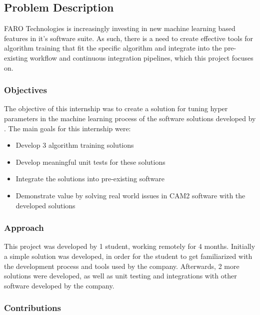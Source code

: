 
\subsection{Problem Description}

FARO Technologies\textsuperscript{\textregistered} is increasingly investing in new machine learning based features in it's software suite. As such, there is a need to create effective tools for algorithm training that fit the specific algorithm and integrate into the pre-existing workflow and continuous integration pipelines, which this project focuses on.

\subsubsection{Objectives}

The objective of this internship was to create a solution for tuning hyper parameters in the machine learning process of the software solutions developed by \faro{}. The main goals for this internship were:

\begin{itemize}
	\item Develop 3 algorithm training solutions
	\item Develop meaningful unit tests for these solutions
	\item Integrate the solutions into pre-existing software
	\item Demonstrate value by solving real world issues in CAM2\textsuperscript{\textregistered} software with the developed solutions
\end{itemize}

\subsubsection{Approach}

This project was developed by 1 student, working remotely for 4 months. Initially a simple solution was developed, in order for the student to get familiarized with the development process and tools used by the company. Afterwards, 2 more solutions were developed, as well as unit testing and integrations with other software developed by the company.

\subsubsection{Contributions}

